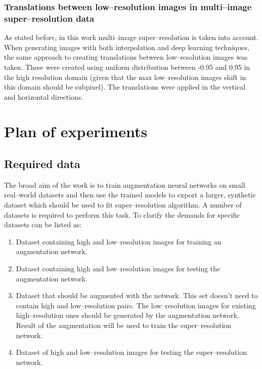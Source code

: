 \subsubsection{Translations between low--resolution images in multi--image super--resolution data}
As stated before, in this work multi--image super--resolution is taken into account.
When generating images with both interpolation and deep learning techniques, the same approach to creating translations between low--resolution images was taken.
These were created using uniform distribution between -0.95 and 0.95 in the high resolution domain (given that the max low--resolution images shift in this domain should be subpixel).
The translations were applied in the vertical and horizontal directions.

\section{Plan of experiments}
\subsection{Required data}
The broad aim of the work is to train augmentation neural networks on small real--world datasets and then use the trained models to export a larger, synthetic dataset which should be used to fit super--resolution algorithm.
A number of datasets is required to perform this task.
To clarify the demands for specific datasets can be listed as:
\begin{enumerate}
	\item Dataset containing high and low--resolution images for training an augmentation network.
	\item Dataset containing high and low--resolution images for testing the augmentation network.
	\item Dataset that should be augmented with the network.
	      This set doesn't need to contain high and low--resolution pairs.
	      The low--resolution images for existing high--resolution ones should be generated by the augmentation network.
	      Result of the augmentation will be used to train the super--resolution network.
	 \item Dataset of high and low--resolution images for testing the super--resolution network.
\end{enumerate}

